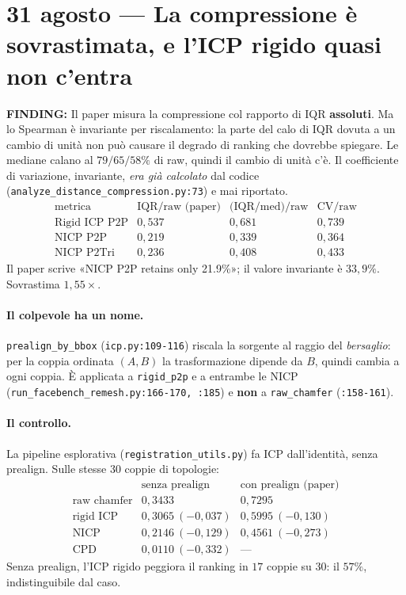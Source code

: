 \documentclass[11pt,a4paper]{article}
\newcommand{\finding}[1]{\textcolor{finding}{\textbf{FINDING:}} #1}
\begin{document}
\section{31 agosto --- La compressione \`e sovrastimata, e l'ICP rigido quasi non c'entra}

\finding{Il paper misura la compressione col rapporto di IQR \textbf{assoluti}. Ma lo Spearman
\`e invariante per riscalamento: la parte del calo di IQR dovuta a un cambio di unit\`a non pu\`o
causare il degrado di ranking che dovrebbe spiegare. Le mediane calano al $79/65/58\%$ di raw,
quindi il cambio di unit\`a c'\`e. Il coefficiente di variazione, invariante, \emph{era gi\`a
calcolato} dal codice (\texttt{analyze\_distance\_compression.py:73}) e mai riportato.
\[
\begin{array}{lccc}
\text{metrica} & \text{IQR/raw (paper)} & \text{(IQR/med)/raw} & \text{CV/raw} \\
\hline
\text{Rigid ICP P2P} & 0{,}537 & 0{,}681 & 0{,}739 \\
\text{NICP P2P} & 0{,}219 & 0{,}339 & 0{,}364 \\
\text{NICP P2Tri} & 0{,}236 & 0{,}408 & 0{,}433
\end{array}
\]
Il paper scrive «NICP P2P retains only 21.9\%»; il valore invariante \`e $33{,}9\%$. Sovrastima
$1{,}55\times$.}

\paragraph{Il colpevole ha un nome.} \texttt{prealign\_by\_bbox} (\texttt{icp.py:109-116})
riscala la sorgente al raggio del \emph{bersaglio}: per la coppia ordinata $(A,B)$ la
trasformazione dipende da $B$, quindi cambia a ogni coppia. \`E applicata a \texttt{rigid\_p2p} e
a entrambe le NICP (\texttt{run\_facebench\_remesh.py:166-170, :185}) e \textbf{non} a
\texttt{raw\_chamfer} (\texttt{:158-161}).

\paragraph{Il controllo.} La pipeline esplorativa (\texttt{registration\_utils.py}) fa ICP
dall'identit\`a, senza prealign. Sulle stesse $30$ coppie di topologie:
\[
\begin{array}{lcc}
 & \text{senza prealign} & \text{con prealign (paper)} \\
\hline
\text{raw chamfer} & 0{,}3433 & 0{,}7295 \\
\text{rigid ICP} & 0{,}3065\ (-0{,}037) & 0{,}5995\ (-0{,}130) \\
\text{NICP} & 0{,}2146\ (-0{,}129) & 0{,}4561\ (-0{,}273) \\
\text{CPD} & 0{,}0110\ (-0{,}332) & \text{---}
\end{array}
\]
Senza prealign, l'ICP rigido peggiora il ranking in $17$ coppie su $30$: il $57\%$,
indistinguibile dal caso.
\end{document}
